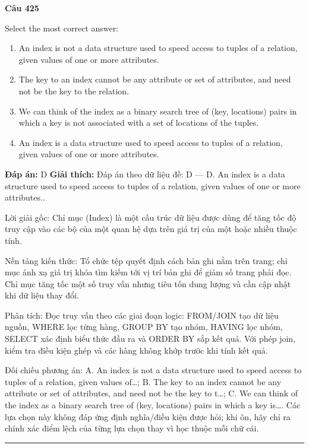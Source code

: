 \documentclass[11pt,a4paper]{article}
\newenvironment{question}[1]{%
  \par\vspace{1em}\noindent\textbf{\large Câu #1}\par\vspace{0.4em}
}{%
  \par\vspace{1em}\hrule\vspace{0.6em}
}
\newenvironment{choices}{%
  \begin{enumerate}[label=\textbf{\Alph*.},leftmargin=2.2em,itemsep=2pt,topsep=3pt]
}{%
  \end{enumerate}
}
\newcommand{\choice}{\item}
\begin{document}
\begin{question}{425}
Select the most correct answer:
\begin{choices}
\choice An index is not a data structure used to speed access to tuples of a relation, given values of one or more attributes.
\choice The key to an index cannot be any attribute or set of attributes, and need not be the key to the relation.
\choice We can think of the index as a binary search tree of (key, locations) pairs in which a key is not associated with a set of locations of the tuples.
\choice An index is a data structure used to speed access to tuples of a relation, given values of one or more attributes.
\end{choices}
\textbf{Đáp án:} D
\textbf{Giải thích:} Đáp án theo dữ liệu đề: D — D. An index is a data structure used to speed access to tuples of a relation, given values of one or more attributes..

Lời giải gốc: Chỉ mục (Index) là một cấu trúc dữ liệu được dùng để tăng tốc độ truy cập vào các bộ của một quan hệ dựa trên giá trị của một hoặc nhiều thuộc tính.

Nền tảng kiến thức: Tổ chức tệp quyết định cách bản ghi nằm trên trang; chỉ mục ánh xạ giá trị khóa tìm kiếm tới vị trí bản ghi để giảm số trang phải đọc. Chỉ mục tăng tốc một số truy vấn nhưng tiêu tốn dung lượng và cần cập nhật khi dữ liệu thay đổi.

Phân tích: Đọc truy vấn theo các giai đoạn logic: FROM/JOIN tạo dữ liệu nguồn, WHERE lọc từng hàng, GROUP BY tạo nhóm, HAVING lọc nhóm, SELECT xác định biểu thức đầu ra và ORDER BY sắp kết quả. Với phép join, kiểm tra điều kiện ghép và các hàng không khớp trước khi tính kết quả.

Đối chiếu phương án: A. An index is not a data structure used to speed access to tuples of a relation, given values of…; B. The key to an index cannot be any attribute or set of attributes, and need not be the key to t…; C. We can think of the index as a binary search tree of (key, locations) pairs in which a key is…. Các lựa chọn này không đáp ứng định nghĩa/điều kiện được hỏi; khi ôn, hãy chỉ ra chính xác điểm lệch của từng lựa chọn thay vì học thuộc mỗi chữ cái.
\end{question}
\end{document}
